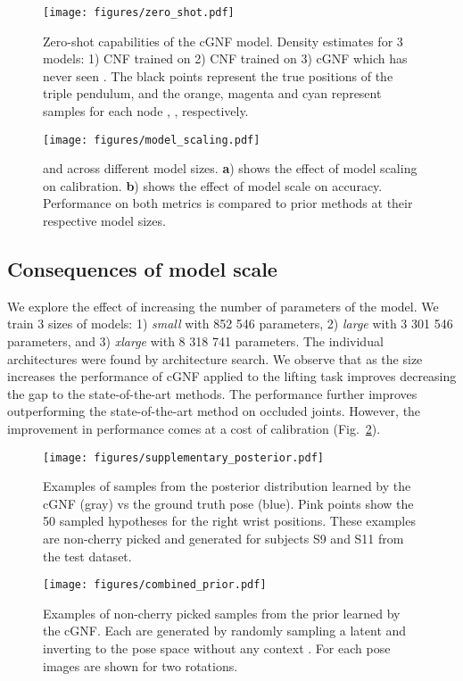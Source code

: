 \documentclass{article} \usepackage{iclr2023_conference,times}
\begin{document}
\begin{figure}[t]
\centering
\texttt{[image: figures/zero\_shot.pdf]}
\caption{Zero-shot capabilities of the cGNF model. Density estimates for 3 models: 1) CNF trained on  2) CNF trained on  3) cGNF which has never seen . The black points represent the true positions of the triple pendulum, and the orange, magenta and cyan represent samples for each node , ,  respectively.}
\label{fig:fig4}
\end{figure}

\begin{figure}[h]
\centering
\texttt{[image: figures/model\_scaling.pdf]}
\caption{ and  across different model sizes. \textbf{a}) shows the effect of model scaling on calibration. \textbf{b}) shows the effect of model scale on accuracy. Performance on both metrics is compared to prior methods at their respective model sizes.
}
\label{fig:model_scaling}
\end{figure}
\subsection{Consequences of model scale}
\label{sec:app_model_scale}
We explore the effect of increasing the number of parameters of the model. We train 3 sizes of models: 1) \textit{small} with 852 546 parameters, 2) \textit{large} with 3 301 546 parameters, and 3) \textit{xlarge} with 8 318 741 parameters. The individual architectures were found by architecture search. We observe that as the size increases the performance of cGNF applied to the lifting task improves decreasing the gap to the state-of-the-art methods.
The performance further improves outperforming the state-of-the-art method on occluded joints.
However, the improvement in performance comes at a cost of calibration (Fig.~\ref{fig:model_scaling}).

\begin{figure}[t!]
\centering
\texttt{[image: figures/supplementary\_posterior.pdf]}
\caption{Examples of samples from the posterior distribution learned by the cGNF (gray) vs the ground truth pose (blue).
Pink points show the 50 sampled hypotheses for the right wrist positions.
These examples are non-cherry picked and generated for subjects S9 and S11 from the test dataset.}
\label{fig:supp_posterior}
\end{figure}

\begin{figure}[t!]
\centering
\texttt{[image: figures/combined\_prior.pdf]}
\caption{Examples of non-cherry picked samples from the prior learned by the cGNF. Each are generated by randomly sampling a latent  and inverting to the pose space  without any context .
For each pose images are shown for two rotations.
}
\label{fig:prior_samples}
\end{figure}
\end{document}
